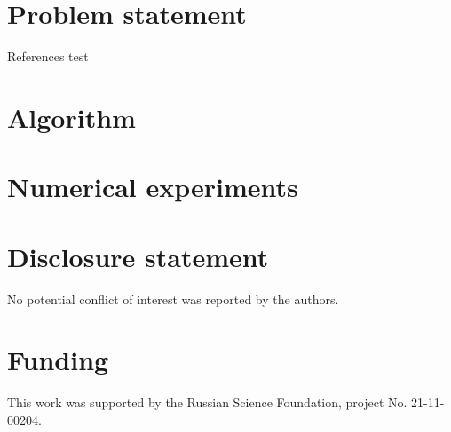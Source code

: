 \documentclass[]{interact}
\theoremstyle{plain}%
\theoremstyle{definition}
\theoremstyle{remark}
\begin{document}
\section{Problem statement}

References test \cite{Strongin2000,Grishagin2018}

\section{Algorithm}

\section{Numerical experiments}


\section*{Disclosure statement}

No potential conflict of interest was reported by the authors.

\section*{Funding}

This work was supported by the Russian Science Foundation, project No. 21-11-00204.





\end{document}
